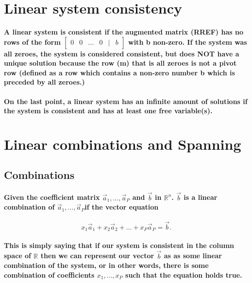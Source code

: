 \documentclass{report}
\begin{document}
\begin{multicols}{2}
\section{Linear system consistency}%
\label{sec: Linear system consistency }
\paragraph{A linear system is consistent if the augmented matrix (RREF) has no rows of the form $ \begin{bmatrix} 0 & 0 & \ldots & 0 & \bigg| & b \end{bmatrix}  $ with b non-zero. If the system was all zeroes, the system is considered consistent, but does NOT have a unique solution because the row (m) that is all zeroes is not a pivot row (defined as a row which contains a non-zero number b which is preceded by all zeroes.)}

\paragraph{On the last point, a linear system has an infinite amount of solutions if the system is consistent and has at least one free variable(s).}
\section{Linear combinations and Spanning }%
\label{sec: Linear combinations and Spanning  }
\subsection{Combinations}%
\label{sub: Combinations }

\paragraph{Given the coefficient matrix $ \vec{ a }_1 , \ldots , \vec{ a }_P$ and $ \vec{ b } $ in $ \mathbb{R}^{ n } $. $ \vec{ b } $ is a linear combination of $ \vec{ a }_1 , \ldots , \vec{ a }_P$if the vector equation	}
\[
x_1 \vec{ a }_1 + x_2 \vec{ a }_2 + \ldots + x_P \vec{ a }_P = \vec{ b }
.\] 
\paragraph{This is simply saying that if our system is consistent in the column space of $ \mathbb{R} $ then we can represent our vector $ \vec{ b } $ as as some linear combination of the system, or in other words, there is some combination of coefficients $ x_1 , \ldots , x_P$ such that the equation holds true.}


\end{multicols}
\end{document}
